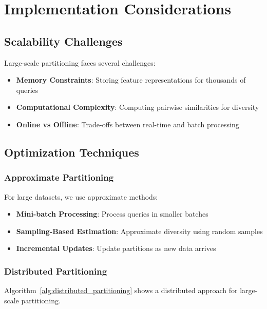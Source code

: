 \section{Implementation Considerations}

\subsection{Scalability Challenges}

Large-scale partitioning faces several challenges:

\begin{itemize}
    \item \textbf{Memory Constraints}: Storing feature representations for thousands of queries
    \item \textbf{Computational Complexity}: Computing pairwise similarities for diversity
    \item \textbf{Online vs Offline}: Trade-offs between real-time and batch processing
\end{itemize}

\subsection{Optimization Techniques}

\subsubsection{Approximate Partitioning}

For large datasets, we use approximate methods:

\begin{itemize}
    \item \textbf{Mini-batch Processing}: Process queries in smaller batches
    \item \textbf{Sampling-Based Estimation}: Approximate diversity using random samples
    \item \textbf{Incremental Updates}: Update partitions as new data arrives
\end{itemize}

\subsubsection{Distributed Partitioning}

Algorithm~\ref{alg:distributed_partitioning} shows a distributed approach for large-scale partitioning.

